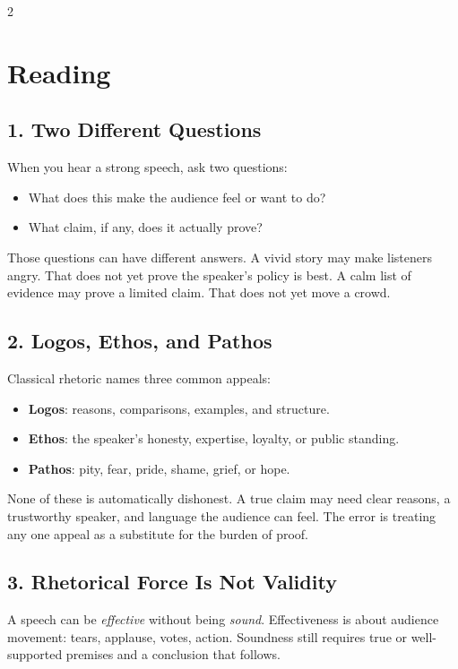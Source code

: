 \documentclass[12pt]{article}
\begin{document}
\begin{multicols}{2}
\section*{Reading}

\subsection*{1. Two Different Questions}
When you hear a strong speech, ask two questions:

\begin{itemize}[leftmargin=*]
\item What does this make the audience feel or want to do?
\item What claim, if any, does it actually prove?
\end{itemize}

Those questions can have different answers. A vivid story may make listeners angry. That does not yet prove the speaker's policy is best. A calm list of evidence may prove a limited claim. That does not yet move a crowd.

\subsection*{2. Logos, Ethos, and Pathos}
Classical rhetoric names three common appeals:

\begin{itemize}[leftmargin=*]
\item \textbf{Logos}: reasons, comparisons, examples, and structure.
\item \textbf{Ethos}: the speaker's honesty, expertise, loyalty, or public standing.
\item \textbf{Pathos}: pity, fear, pride, shame, grief, or hope.
\end{itemize}

None of these is automatically dishonest. A true claim may need clear reasons, a trustworthy speaker, and language the audience can feel. The error is treating any one appeal as a substitute for the burden of proof.

\subsection*{3. Rhetorical Force Is Not Validity}
A speech can be \textit{effective} without being \textit{sound}. Effectiveness is about audience movement: tears, applause, votes, action. Soundness still requires true or well-supported premises and a conclusion that follows.


\end{multicols}
\end{document}
